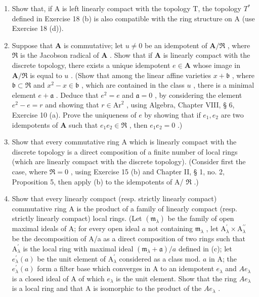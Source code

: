 \begin{enumerate}
\def\labelenumi{(\alph{enumi})}
\item
  Show that, if A is left linearly compact with the topology T, the topology \(T^{*}\) defined in Exercise 18 (b) is also compatible with the ring structure on A (use Exercise 18 (d)).
\item
  Suppose that \(\mathbf{A}\) is commutative; let \(u \neq 0\) be an idempotent of \(\mathbf{A} / \Re\) , where \(\Re\) is the Jacobson radical of \(\mathbf{A}\) . Show that if \(\mathbf{A}\) is linearly compact with the discrete topology, there exists a unique idempotent \(e \in \mathbf{A}\) whose image in \(\mathbf{A} / \Re\) is equal to \(u\) . (Show that among the linear affine varieties \(x + \mathfrak{b}\) , where \(\mathfrak{b} \subset \Re\) and \(x^2 - x \in \mathfrak{b}\) , which are contained in the class \(u\) , there is a minimal element \(e + \mathfrak{a}\) . Deduce that \(e^2 = e\) and \(\mathfrak{a} = 0\) , by considering the element \(e^2 - e = r\) and showing that \(r \in \mathrm{Ar}^2\) , using Algebra, Chapter VIII, § 6, Exercise 10 (a). Prove the uniqueness of \(e\) by showing that if \(e_1, e_2\) are two idempotents of \(\mathbf{A}\) such that \(e_1 e_2 \in \Re\) , then \(e_1 e_2 = 0\) .)
\item
  Show that every commutative ring A which is linearly compact with the discrete topology is a direct composition of a finite number of local rings (which are linearly compact with the discrete topology). (Consider first the case, where \(\Re = 0\) , using Exercise 15 (b) and Chapter II, § 1, no. 2, Proposition 5, then apply (b) to the idempotents of A/ \(\Re\) .)
\item
  Show that every linearly compact (resp. strictly linearly compact) commutative ring A is the product of a family of linearly compact (resp. strictly linearly compact) local rings. (Let \((\mathfrak{m}_{\lambda})\) be the family of open maximal ideals of A; for every open ideal \(a\) not containing \(\mathfrak{m}_{\lambda}\) , let \(\mathrm{A}_{\lambda}^{\prime} \times \mathrm{A}_{\lambda}^{\prime \prime}\) be the decomposition of A/a as a direct composition of two rings such that \(\mathrm{A}_{\lambda}^{\prime}\) is the local ring with maximal ideal \((\mathfrak{m}_{\lambda} + \mathfrak{a}) / a\) defined in (c); let \(e_{\lambda}^{\prime}(a)\) be the unit element of \(\mathrm{A}_{\lambda}^{\prime}\) considered as a class mod. \(a\) in A; the \(e_{\lambda}^{\prime}(a)\) form a filter base which converges in A to an idempotent \(e_{\lambda}\) and \(Ae_{\lambda}\) is a closed ideal of A of which \(e_{\lambda}\) is the unit element. Show that the ring \(Ae_{\lambda}\) is a local ring and that A is isomorphic to the product of the \(Ae_{\lambda}\) .
\end{enumerate}


